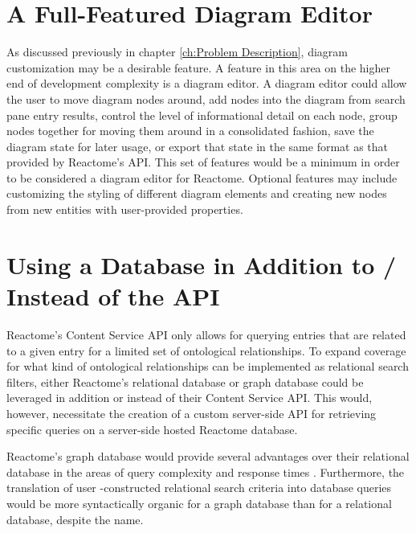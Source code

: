 \documentclass[12pt]{report}
\begin{document}
\section {A Full-Featured Diagram Editor}
As discussed previously in chapter \ref{ch:Problem Description}, diagram customization may be a desirable feature. A feature in this area on the higher end of development complexity is a diagram editor. A diagram editor could allow the user to move diagram nodes around, add nodes into the diagram from search pane entry results, control the level of informational detail on each node, group nodes together for moving them around in a consolidated fashion, save the diagram state for later usage, or export that state in the same format as that provided by Reactome's API. This set of features would be a minimum in order to be considered a diagram editor for Reactome. Optional features may include customizing the styling of different diagram elements and creating new nodes from new entities with user-provided properties.

\section {Using a Database in Addition to / Instead of the API}
Reactome's Content Service API only allows for querying entries that are related to a given entry for a limited set of ontological relationships. To expand coverage for what kind of ontological relationships can be implemented as relational search filters, either Reactome's relational database or graph database could be leveraged in addition or instead of their Content Service API. This would, however, necessitate the creation of a custom server-side API for retrieving specific queries on a server-side hosted Reactome database.

Reactome's graph database would provide several advantages over their relational database in the areas of query complexity and response times \cite{FabregatAntonio2018RgdE}. Furthermore, the translation of user -constructed relational search criteria into database queries would be more syntactically organic for a graph database than for a relational database, despite the name.




%
\end{document}
